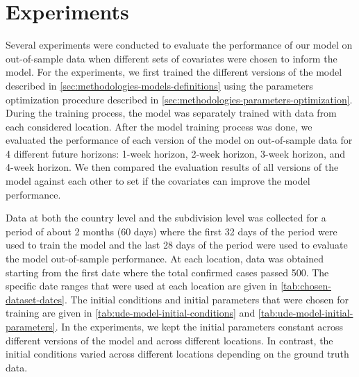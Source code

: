 \section{Experiments}

Several experiments were conducted to evaluate the performance of our model on out-of-sample data when different sets of covariates were chosen to inform the model.
For the experiments, we first trained the different versions of the model described in \autoref{sec:methodologies-models-definitions} using the parameters optimization procedure described in \autoref{sec:methodologies-parameters-optimization}.
During the training process, the model was separately trained with data from each considered location.
After the model training process was done, we evaluated the performance of each version of the model on out-of-sample data for 4 different future horizons: 1-week horizon, 2-week horizon, 3-week horizon, and 4-week horizon.
We then compared the evaluation results of all versions of the model against each other to set if the covariates can improve the model performance.

Data at both the country level and the subdivision level was collected for a period of about 2 months (60 days) where the first 32 days of the period were used to train the model and the last 28 days of the period were used to evaluate the model out-of-sample performance.
At each location, data was obtained starting from the first date where the total confirmed cases passed 500.
The specific date ranges that were used at each location are given in \autoref{tab:chosen-dataset-dates}.
The initial conditions and initial parameters that were chosen for training are given in \autoref{tab:ude-model-initial-conditions} and \autoref{tab:ude-model-initial-parameters}.
In the experiments, we kept the initial parameters constant across different versions of the model and across different locations.
In contrast, the initial conditions varied across different locations depending on the ground truth data.

